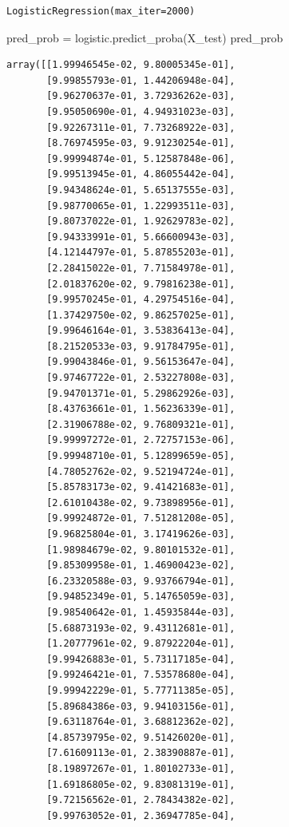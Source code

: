 \documentclass[
  11pt,
  letterpaper,
  DIV=11,
  numbers=noendperiod]{scrartcl}
\newenvironment{Shaded}{\begin{snugshade}}{\end{snugshade}}
\newcommand{\NormalTok}[1]{\textcolor[rgb]{0.00,0.23,0.31}{#1}}
\newcommand{\OperatorTok}[1]{\textcolor[rgb]{0.37,0.37,0.37}{#1}}
\begin{document}
\begin{verbatim}
LogisticRegression(max_iter=2000)
\end{verbatim}

\begin{Shaded}
\begin{Highlighting}[]
\NormalTok{pred\_prob }\OperatorTok{=}\NormalTok{ logistic.predict\_proba(X\_test)}
\NormalTok{pred\_prob}
\end{Highlighting}
\end{Shaded}

\begin{verbatim}
array([[1.99946545e-02, 9.80005345e-01],
       [9.99855793e-01, 1.44206948e-04],
       [9.96270637e-01, 3.72936262e-03],
       [9.95050690e-01, 4.94931023e-03],
       [9.92267311e-01, 7.73268922e-03],
       [8.76974595e-03, 9.91230254e-01],
       [9.99994874e-01, 5.12587848e-06],
       [9.99513945e-01, 4.86055442e-04],
       [9.94348624e-01, 5.65137555e-03],
       [9.98770065e-01, 1.22993511e-03],
       [9.80737022e-01, 1.92629783e-02],
       [9.94333991e-01, 5.66600943e-03],
       [4.12144797e-01, 5.87855203e-01],
       [2.28415022e-01, 7.71584978e-01],
       [2.01837620e-02, 9.79816238e-01],
       [9.99570245e-01, 4.29754516e-04],
       [1.37429750e-02, 9.86257025e-01],
       [9.99646164e-01, 3.53836413e-04],
       [8.21520533e-03, 9.91784795e-01],
       [9.99043846e-01, 9.56153647e-04],
       [9.97467722e-01, 2.53227808e-03],
       [9.94701371e-01, 5.29862926e-03],
       [8.43763661e-01, 1.56236339e-01],
       [2.31906788e-02, 9.76809321e-01],
       [9.99997272e-01, 2.72757153e-06],
       [9.99948710e-01, 5.12899659e-05],
       [4.78052762e-02, 9.52194724e-01],
       [5.85783173e-02, 9.41421683e-01],
       [2.61010438e-02, 9.73898956e-01],
       [9.99924872e-01, 7.51281208e-05],
       [9.96825804e-01, 3.17419626e-03],
       [1.98984679e-02, 9.80101532e-01],
       [9.85309958e-01, 1.46900423e-02],
       [6.23320588e-03, 9.93766794e-01],
       [9.94852349e-01, 5.14765059e-03],
       [9.98540642e-01, 1.45935844e-03],
       [5.68873193e-02, 9.43112681e-01],
       [1.20777961e-02, 9.87922204e-01],
       [9.99426883e-01, 5.73117185e-04],
       [9.99246421e-01, 7.53578680e-04],
       [9.99942229e-01, 5.77711385e-05],
       [5.89684386e-03, 9.94103156e-01],
       [9.63118764e-01, 3.68812362e-02],
       [4.85739795e-02, 9.51426020e-01],
       [7.61609113e-01, 2.38390887e-01],
       [8.19897267e-01, 1.80102733e-01],
       [1.69186805e-02, 9.83081319e-01],
       [9.72156562e-01, 2.78434382e-02],
       [9.99763052e-01, 2.36947785e-04],

\end{verbatim}
\end{document}
